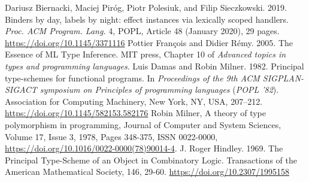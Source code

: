 \documentclass[declaration,shortabstract]{iithesis}
\theoremstyle{definition} \newtheorem{definition}{Definition}[section]
\begin{document}
\begin{thebibliography}{1}
    Dariusz Biernacki, Maciej Piróg, Piotr Polesiuk, and Filip Sieczkowski. 2019. Binders by day, labels by night: effect instances via lexically scoped handlers. \textit{Proc. ACM Program. Lang.} 4, POPL, Article 48 (January 2020), 29 pages. \url{https://doi.org/10.1145/3371116}
    Pottier François and Didier Rémy. 2005.
    The Essence of ML Type Inference.
    MIT press, Chapter 10 of \textit{Advanced topics in types and programming languages}.
    Luis Damas and Robin Milner. 1982. Principal type-schemes for functional programs. In \textit{Proceedings of the 9th ACM SIGPLAN-SIGACT symposium on Principles of programming languages} (\textit{POPL '82}). Association for Computing Machinery, New York, NY, USA, 207–212. \url{https://doi.org/10.1145/582153.582176}
    Robin Milner,
    A theory of type polymorphism in programming,
    Journal of Computer and System Sciences,
    Volume 17, Issue 3,
    1978,
    Pages 348-375,
    ISSN 0022-0000,
     \url{https://doi.org/10.1016/0022-0000(78)90014-4}.
    J. Roger Hindley. 1969. The Principal Type-Scheme of an Object in Combinatory Logic. Transactions of the American Mathematical Society, 146, 29-60. \url{https://doi.org/10.2307/1995158}


    
\end{thebibliography}
\end{document}
